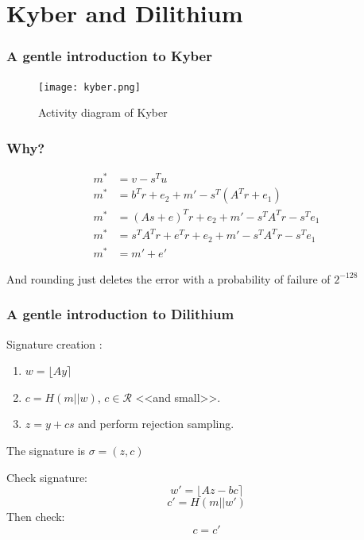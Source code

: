 \documentclass[presentation]{beamer}
\begin{document}
\section{Kyber and Dilithium}
\begin{frame}[label=a-gentle-introduction-to-kyber]
  \frametitle{A gentle introduction to Kyber}
  \begin{figure}
    \centering
    \texttt{[image: kyber.png]}
    \caption{Activity diagram of Kyber \cite{kyber-spec}}
  \end{figure}
\end{frame}
\begin{frame}
  \frametitle{Why?}
  \begin{equation}
    \begin{array}{rl}
      m^* &= v - s^T u \\
      m^* &= b^T r + e_2 + m' - s^T(A^T r + e_1) \\
      m^* &= (As+e)^Tr + e_2 + m' - s^TA^Tr - s^Te_1 \\
      m^* &= s^TA^Tr + e^Tr + e_2 + m'  - s^TA^Tr - s^Te_1 \\
      m^* &= m' + e'
    \end{array}
  \end{equation}

  And rounding just deletes the error with a probability of
  failure of $2^{-128}$

\end{frame}
\begin{frame}[label=a-gentle-introduction-to-dilithium]
  \frametitle{A gentle introduction to Dilithium}
  Signature creation \cite{dilithium-spec}:
  \begin{enumerate} 
    \item $w = \lfloor Ay \rceil$
    \item $c = H(m || w)$, $c \in \mathcal R$ <<and small>>.
    \item $z = y + cs$ and perform rejection sampling.
  \end{enumerate}
  The signature is $\sigma = (z, c)$
  \pause

  Check signature:
  \[w' = \lfloor Az - bc \rceil \]
  \[c' = H(m || w') \]
  Then check:
  \[c = c'\]
\end{frame}
\end{document}
